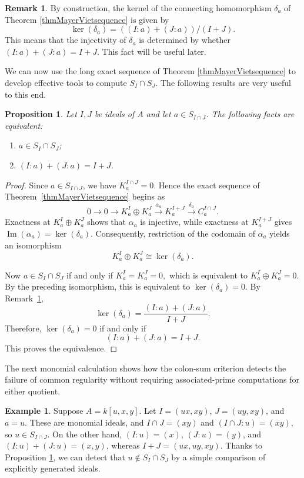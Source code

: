 \documentclass[11pt,leqno]{amsart}
\newtheorem{proposition}[theorem]{Proposition}
\theoremstyle{definition}
\newtheorem{remark}[theorem]{Remark}
\newtheorem{example}[theorem]{Example}
\numberwithin{equation}{section}
\begin{document}
\begin{remark}\label{remkerdelta}
    By construction, the kernel of the connecting homomorphism $\delta_{a}$ of Theorem \ref{thmMayerVietsequence} is given by 
    $$\ker(\delta_a)=((I:a)+(J:a))/(I+J).$$
    This means that the injectivity of $\delta_a$ is determined by whether $(I:a)+(J:a)=I+J$. This fact will be useful later.
\end{remark}

 We can now use the long exact sequence of Theorem \ref{thmMayerVietsequence} to develop effective tools to compute $S_I \cap S_J$. The following results are very useful to this end.

 

 \begin{proposition}\label{propeqfacts}
     Let $I,J$ be ideals of $A$ and let $a\in S_{I\cap J}$. The following facts are equivalent:
     \begin{enumerate}
         \item $a\in S_I \cap S_J$;
         \item $(I:a)+(J:a)=I+J$.
     \end{enumerate}
 \end{proposition}
\begin{proof}
	Since $a\in S_{I\cap J}$, we have
	$
	K_a^{I\cap J}=0.
	$
	Hence the exact sequence of Theorem~\ref{thmMayerVietsequence} begins as
	\[
	0\longrightarrow 0
	\longrightarrow K_a^I\oplus K_a^J
	\xrightarrow{\alpha_a} K_a^{I+J}
	\xrightarrow{\delta_a} C_a^{I\cap J}.
	\]
	Exactness at $K_a^I\oplus K_a^J$ shows that $\alpha_a$ is injective, while
	exactness at $K_a^{I+J}$ gives
	$
	\operatorname{Im}(\alpha_a)=\ker(\delta_a).
	$
	Consequently, restriction of the codomain of $\alpha_a$ yields an
	isomorphism
	\[
	K_a^I\oplus K_a^J \cong \ker(\delta_a).
	\]
	
	Now
	$
	a\in S_I\cap S_J
	$
	if and only if
	$
	K_a^I=K_a^J=0,
	$
	which is equivalent to
	$
	K_a^I\oplus K_a^J=0.
	$
	By the preceding isomorphism, this is equivalent to
	$
	\ker(\delta_a)=0.
	$
	By Remark~\ref{remkerdelta},
	\[
	\ker(\delta_a)
	=
	\frac{(I:a)+(J:a)}{I+J}.
	\]
	Therefore,
	$
	\ker(\delta_a)=0
	$
	if and only if
	\[
	(I:a)+(J:a)=I+J.
	\]
	This proves the equivalence.
\end{proof}


The next monomial calculation shows how the colon-sum criterion detects the failure of common regularity without requiring associated-prime computations for either quotient.

\begin{example}\label{monomialex}
Suppose $A=k[u,x,y]$. Let
\(
I=(ux,xy)\),  $J=(uy,xy)$, and $a=u$.
These are monomial ideals, and
$
I\cap J=(xy)$ and $(I\cap J:u)=(xy)$,
so $u\in S_{I\cap J}$. On the other hand,
$
(I:u)=(x)$, $(J:u)=(y)$, and
$(I:u)+(J:u)=(x,y)$,
whereas $I+J=(ux,uy,xy)$. Thanks to Proposition \ref{propeqfacts}, we can detect that $u\notin S_I\cap S_J$ by a simple comparison of explicitly generated ideals.
\end{example}
\end{document}

